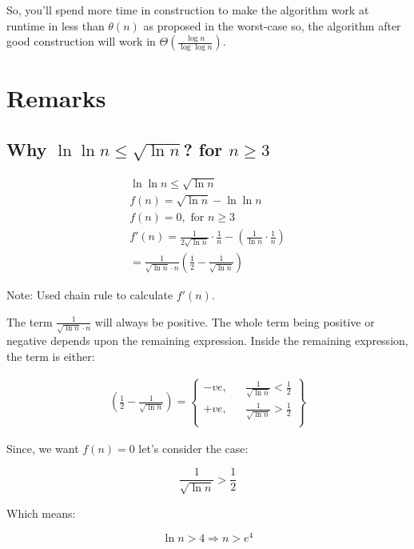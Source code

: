 \documentclass{article}
\begin{document}
So, you'll spend more time in construction to make the algorithm work at runtime in less than $\theta(n)$ as proposed in the worst-case so, the algorithm after good construction will work in $\Theta\left(\frac{\log n}{\log \log n}\right)$.

\section{Remarks}

\subsection{Why $\ln \ln n \leq \sqrt{\ln n}$? for $n \geq 3$}\label{ln-ln-n-proof}

\begin{align*}
    \ln \ln n \leq \sqrt{\ln n} \\
    f(n) = \sqrt{\ln n} - \ln \ln n \\
    f(n) = 0, \text{ for } n \geq 3 \\
    f'(n) = \frac{1}{2\sqrt{\ln n}} \cdot \frac{1}{n} - \left(\frac{1}{\ln n} \cdot \frac{1}{n}\right) \\
    = \frac{1}{\sqrt{\ln n} \cdot n} \left(\frac{1}{2} - \frac{1}{\sqrt{\ln n}}\right)
\end{align*}

Note: Used chain rule to calculate $f'(n)$.

The term $\frac{1}{\sqrt{\ln n} \cdot n}$ will always be positive. The whole term being positive or negative depends upon the remaining expression. Inside the remaining expression, the term is either:

\begin{align*}
\left(\frac{1}{2} - \frac{1}{\sqrt{\ln n}}\right) = \left\{
    \begin{matrix}
        -ve, && \frac{1}{\sqrt{\ln n}} < \frac{1}{2} \\
        +ve, && \frac{1}{\sqrt{\ln n}} > \frac{1}{2} \\
    \end{matrix}
    \right\}
\end{align*}

Since, we want $f(n) = 0$ let's consider the case:

$$
\frac{1}{\sqrt{\ln n}} > \frac{1}{2}
$$

Which means:

$$
\ln n > 4 \Rightarrow n > e^4
$$



\end{document}
